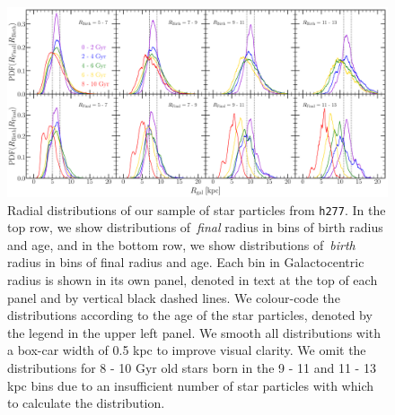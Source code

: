 \documentclass[draft2.tex]{subfiles}
\begin{document}
\begin{figure} 
\centering 
\includegraphics[scale = 0.32]{decomposition.pdf} 
\caption{Radial distributions of our sample of star particles from 
\texttt{h277}. In the top row, we show distributions of~\textit{final} radius 
in bins of birth radius and age, and in the bottom row, we show distributions 
of~\textit{birth} radius in bins of final radius and age. Each bin in 
Galactocentric radius is shown in its own panel, denoted in text at the top of 
each panel and by vertical black dashed lines. We colour-code the distributions 
according to the age of the star particles, denoted by the legend in the upper 
left panel. We smooth all distributions with a box-car width of 0.5 kpc to 
improve visual clarity. We omit the distributions for 8 - 10 Gyr old stars born 
in the 9 - 11 and 11 - 13 kpc bins due to an insufficient number of star 
particles with which to calculate the distribution. } 
\label{fig:h277_decomposition} 
\end{figure} 
\end{document}
